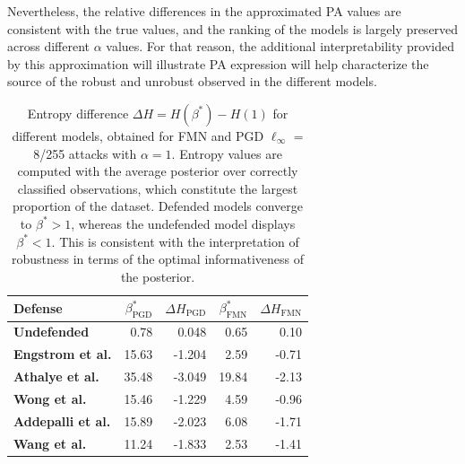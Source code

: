 Nevertheless, the relative differences in the approximated PA values are consistent
with the true values, and the ranking of the models is largely preserved across different
$\alpha$ values. For that reason, the additional interpretability provided by this approximation
will illustrate PA expression will help characterize the source of the robust and unrobust
observed in the different models. \\

\begin{table}[t]
    \centering
        \begin{tabular}{l|rr|rr}
        Defense & $\beta^{*}_{\text{PGD}}$ & $\Delta H_{\text{PGD}}$  & $\beta^{*}_{\text{FMN}}$ & $\Delta H_{\text{FMN}}$ \\
        \midrule
        {\color{tab:orange} \textbf{Undefended}} & 0.78 & 0.048 & 0.65 & 0.10\\
        {\color{tab:blue} \textbf{Engstrom et al.}} & 15.63 & -1.204 & 2.59 & -0.71\\
        {\color{tab:green} \textbf{Athalye et al.}} & 35.48 & -3.049 & 19.84 & -2.13 \\
        {\color{tab:red} \textbf{Wong et al.}} & 15.46 & -1.229 & 4.59 & -0.96\\
        {\color{tab:purple} \textbf{Addepalli et al.}} & 15.89 & -2.023 & 6.08 & -1.71 \\
        {\color{tab:brown} \textbf{Wang et al.}} & 11.24 & -1.833 & 2.53 & -1.41\\
        \bottomrule
        \end{tabular}
        \caption{
        Entropy difference $\Delta H = H(\beta^{*}) - H(1)$
        for different models, obtained for FMN and PGD 
        $\ell_\infty$ = 8/255 attacks with $\alpha = 1$. Entropy values are 
        computed with the average posterior over correctly classified
        observations, which constitute the largest proportion of the dataset.
        Defended models converge to $\beta^{*} > 1$, whereas the undefended
        model displays $\beta^{*} < 1$. This is consistent with the interpretation
        of robustness in terms of the optimal informativeness of the posterior.
        }
        \label{tab:entropy_gibbs}
\end{table}

